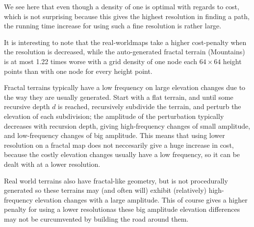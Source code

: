 We see here that even though a density of one is optimal with regards to cost, which is not surprising because this gives the highest resolution in finding a path, the running time increase for using such a fine resolution is rather large. 

It is interesting to note that the real-worldmaps take a higher cost-penalty when the resolution is decreased, while the auto-generated fractal terrain (Mountains) is at most 1.22 times worse with a grid density of one node each $64\times 64$ height points than with one node for every height point. 

Fractal terrains typically have a low frequency on large elevation changes due to the way they are usually generated. Start with a flat terrain, and until some recursive depth $d$ is reached, recursively subdivide the terrain, and perturb the elevation of each subdivision; the amplitude of the perturbation typically decreases with recursion depth, giving high-frequency changes of small amplitude, and low-frequency changes of big amplitude. This means that using lower resolution on a fractal map does not neccesarily give a huge increase in cost, because the costly elevation changes usually have a low frequency, so it can be dealt with at a lower resolution.

Real world terrains also have fractal-like geometry\cite{fractalnature}, but is not procedurally generated so these terrains may (and often will) exhibit (relatively) high-frequency elevation changes with a large amplitude. This of course gives a higher penalty for using a lower resolutionas these big amplitude elevation differences may not be curcumvented by building the road around them.
